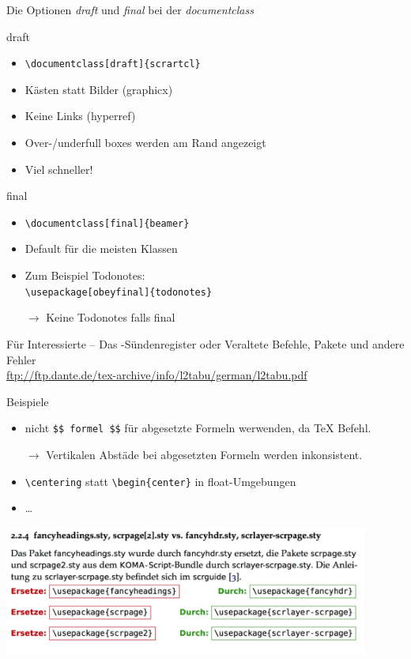 \documentclass[ngerman, hyperref={pdfpagelabels=false}]{beamer}
\begin{document}
\begin{frame}[fragile]{Die Optionen \textit{draft} und \textit{final} bei der
    \textit{documentclass}}
    \begin{block}{draft}
        \begin{itemize}
            \item \verb!\documentclass[draft]{scrartcl}!
            \item Kästen statt Bilder (graphicx)
            \item Keine Links (hyperref)
            \item Over-/underfull boxes werden am Rand angezeigt
            \item Viel schneller!
        \end{itemize}
    \end{block}
    \pause
    \begin{block}{final}
        \begin{itemize}
            \item \verb!\documentclass[final]{beamer}!
            \item Default für die meisten Klassen
                \pause
            \item Zum Beispiel Todonotes:\\
                \verb!\usepackage[obeyfinal]{todonotes}!\\
            \item[$\rightarrow$] Keine Todonotes falls final
        \end{itemize}
    \end{block}
\end{frame}
\begin{frame}[fragile]{Für Interessierte -- Das \LaTeXe{}-Sündenregister}
    {oder Veraltete Befehle, Pakete und andere Fehler \\
    \url{ftp://ftp.dante.de/tex-archive/info/l2tabu/german/l2tabu.pdf}
}
    \begin{block}{Beispiele}
        \begin{itemize}
            \item nicht \verb!$$ formel $$! für abgesetzte Formeln
                werwenden, da \TeX{} Befehl.
            \item[$\rightarrow$] Vertikalen Abstäde bei abgesetzten Formeln
                werden inkonsistent.
            \item \verb!\centering! statt \verb!\begin{center}! in
                    float-Umgebungen
            \item \dots
        \end{itemize}
    \end{block}
    \pause
    \centering
    \includegraphics[width=0.9\textwidth]{figures/suenden.pdf}
\end{frame}
\end{document}
